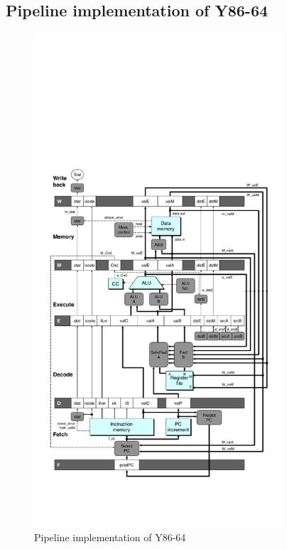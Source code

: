 \subsection{Pipeline implementation of Y86-64}
\begin{figure}
\centering
\includegraphics[height=184mm]{pipeline.pdf}
\caption{Pipeline implementation of Y86-64}
\end{figure}
